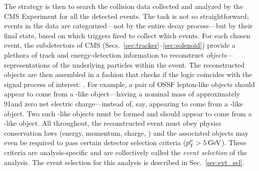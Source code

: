 The strategy is then to search the \pp collision data collected and analyzed by the CMS Experiment for all the detected \hzzfourl events.
The task is not so straightforward;
events in the data are categorized---not by the entire decay process---but by their final state, based on which triggers fired to collect which events.
For each chosen event, the subdetectors of CMS (Secs.~\ref{sec:tracker}--\ref{sec:solenoid}) provide a plethora of track and energy-detection information to reconstruct \emph{objects}---representations of the underlying particles within the event.
The reconstructed objects are then assembled in a fashion that checks if the logic coincides with the signal process of interest: \hzzfourl.  %
For example, a pair of OSSF lepton-like objects should appear to come from a \PZ-like object---\ie having a nominal mass of approximately 91\GeV and zero net electric charge---instead of, say, appearing to come from a \PH-like object.
Two such \PZ-like objects must be formed and should appear to come from a \PH-like object.
All throughout, the reconstructed event must obey physics conservation laws (energy, momentum, charge, \etc) and the associated objects may even be required to pass certain detector selection criteria (\eg $p_{\mathrm{T}}^\mu > 5\,\text{Ge\hspace{-.08em}V}$).
These criteria are analysis-specific and are collectively called the \emph{event selection} of the analysis.
The event selection for this analysis is described in Sec.~\ref{sec:evt_sel}.  %

